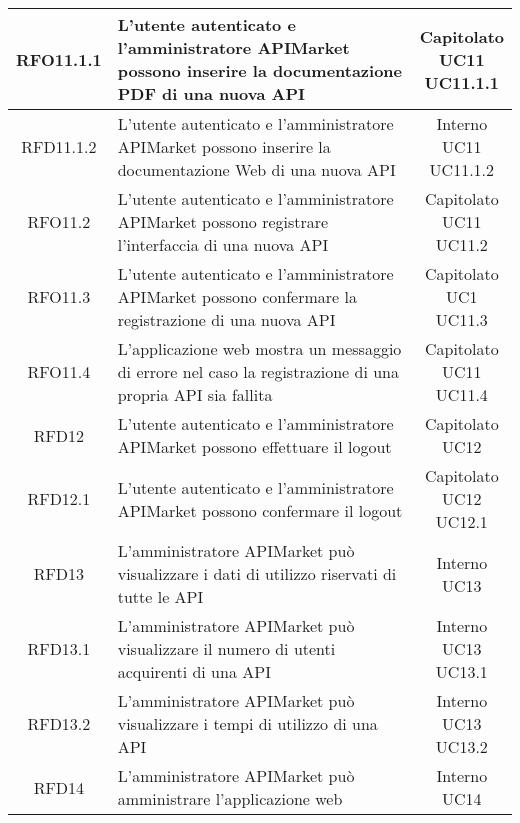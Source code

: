 \begin{longtable}{|c|m{8cm}|c|}
RFO11.1.1 & L'utente autenticato e l'amministratore APIMarket possono inserire la documentazione PDF di una nuova API & \makecell*{Capitolato\\UC11\\UC11.1.1} \\
\hline
RFD11.1.2 & L'utente autenticato e l'amministratore APIMarket possono inserire la documentazione Web di una nuova API & \makecell*{Interno\\UC11\\UC11.1.2} \\
\hline

RFO11.2 & L'utente autenticato e l'amministratore APIMarket possono registrare l'interfaccia di una nuova API & \makecell*{Capitolato\\UC11\\UC11.2} \\
\hline

RFO11.3 & L'utente autenticato e l'amministratore APIMarket possono confermare la registrazione di una nuova API & \makecell*{Capitolato\\UC1\\UC11.3} \\
\hline
RFO11.4 & L'applicazione web mostra un messaggio di errore nel caso la registrazione di una propria API sia fallita & \makecell*{Capitolato\\UC11\\UC11.4} \\
\hline

RFD12 & L'utente autenticato e l'amministratore APIMarket possono effettuare il logout & \makecell*{Capitolato\\UC12} \\
\hline

RFD12.1 & L'utente autenticato e l'amministratore APIMarket possono confermare il logout & \makecell*{Capitolato\\UC12\\UC12.1} \\
\hline

RFD13 & L'amministratore APIMarket può visualizzare i dati di utilizzo riservati di tutte le API & \makecell*{Interno\\UC13} \\
\hline

RFD13.1 & L'amministratore APIMarket può visualizzare il numero di utenti acquirenti di una API & \makecell*{Interno\\UC13\\UC13.1} \\
\hline
RFD13.2 & L'amministratore APIMarket può visualizzare i tempi di utilizzo di una API & \makecell*{Interno\\UC13\\UC13.2} \\
\hline

RFD14 & L'amministratore APIMarket può amministrare l'applicazione web & \makecell*{Interno\\UC14} \\
\hline

\end{longtable}

